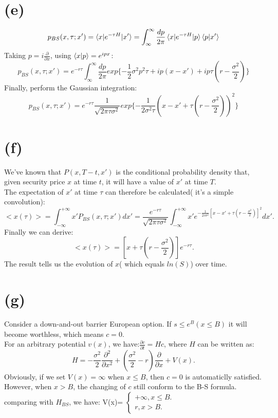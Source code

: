 \documentclass[12pt,a4paper]{paper}
\begin{document}
\section{(e)}
\begin{equation}
p_{BS}(x, \tau; x') = \braket{x|e^{-\tau H}|x'} = \int_{\infty}^{\infty} \frac{dp}{2\pi}\braket{x|e^{-\tau H}|p}\braket{p|x'}
\end{equation}
Taking $p = i \frac{\partial}{\partial x}$, using $\braket{x|p} = e^{ipx}$:
\begin{equation}
p_{BS}(x, \tau;x') = e^{-r\tau}\int_{\infty}^{\infty}\frac{dp}{2\pi}exp\{- \frac{1}{2}\sigma^2p^2\tau + ip(x - x') + ip\tau(r - \frac{\sigma^2}{2}) \}
\end{equation}
Finally, perform the Gaussian integration:
\begin{equation}
p_{BS}(x, \tau;x') = e^{-r\tau} \frac{1}{\sqrt{2\pi \tau \sigma^2}} exp\{ - \frac{1}{2 \sigma^2 \tau}(x - x' + \tau(r - \frac{\sigma^2}{2}) )^2 \}
\end{equation}

\section{(f)}
We've known that $P(x,T-t,x')$ is the conditional probability density that, given security price $x$ at time $t$, it will have a value of $x'$ at time $T$.\\
\indent The expectation of $x'$ at time $\tau$ can therefore be calculated( it's a simple convolution):
\begin{equation}
<x(\tau)>=\int_{-\infty }^{+\infty }x'P_{BS}(x,\tau;x')dx'=\frac{e^{-r\tau}}{\sqrt{2\pi \tau \sigma ^2}}\int_{-\infty }^{+\infty }x'e^{-\frac{1}{2\tau \sigma ^2}[x-x'+\tau(r-\frac{\sigma ^2}{2})]^2}dx'.
\end{equation}
\indent Finally we can derive:
\begin{equation}
<x(\tau)>=[x+\tau(r-\frac{\sigma ^2}{2})]e^{-r\tau}.
\end{equation}
The result tells us the evolution of $x$( which equals $ln(S)$) over time.

\section{(g)}
\indent Consider a down-and-out barrier European option. If $s\leq e^B(x\leq B)$ it will become worthless, which means $c=0$. \\
\indent For an arbitrary potential $v(x)$, we have:$\frac{\partial c}{\partial t}=Hc$, where $H$ can be written as:
\begin{equation}
H=-\frac{\sigma ^2}{2}\frac{\partial^2 }{\partial x^2}+(\frac{\sigma^2}{2} -r)\frac{\partial }{\partial x}+V(x).
\end{equation}
\indent Obviously, if we set $V(x)=\infty$ when $x\leq B$, then $c=0$ is automaticlly satisfied. However, when $x>B$, the changing of $c$ still conform to the B-S formula. comparing with $H_{BS}$, we have:
V(x)=
$\left\{\begin{matrix}
+\infty,x\leq B.\\
r,x>B.
\end{matrix}\right.$
\end{document}
